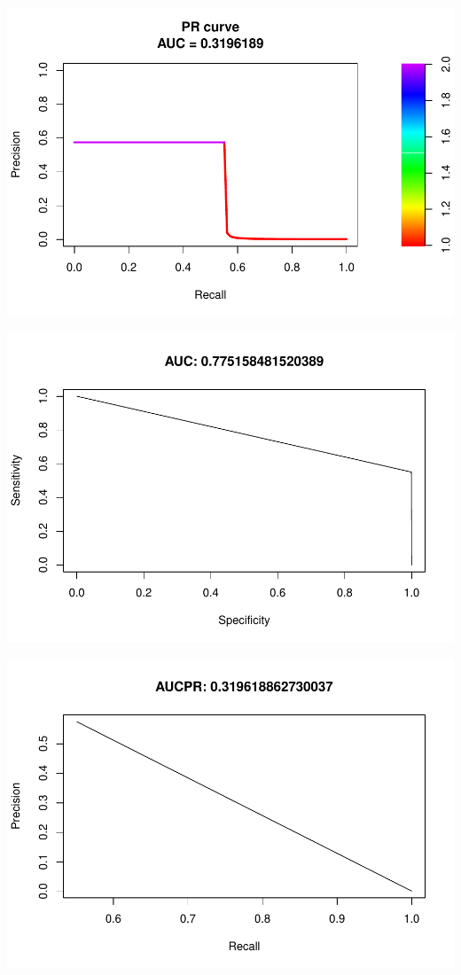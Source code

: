 \documentclass[]{article}
\begin{document}
\begin{center}\includegraphics{Credit_Card_Fraud_Detection_Project_Report_files/figure-latex/unnamed-chunk-19-1} \end{center}

\begin{center}\includegraphics{Credit_Card_Fraud_Detection_Project_Report_files/figure-latex/unnamed-chunk-19-2} \end{center}

\begin{center}\includegraphics{Credit_Card_Fraud_Detection_Project_Report_files/figure-latex/unnamed-chunk-19-3} \end{center}
\end{document}
